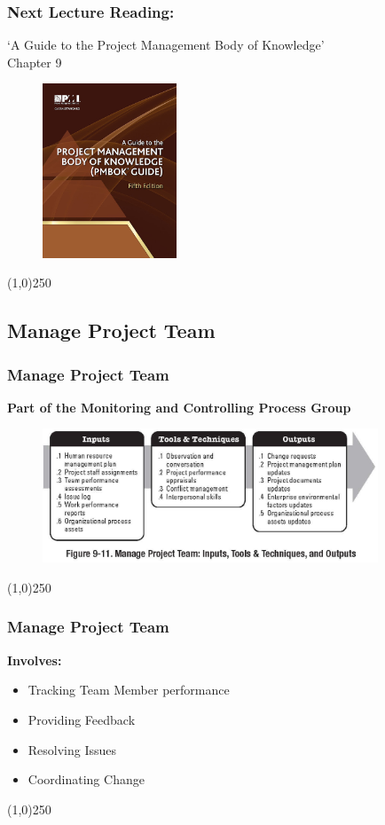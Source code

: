 \begin{frame}
\frametitle{Next Lecture \hfill Reading:}
`A Guide to the Project Management Body of Knowledge'\\ 
Chapter 9
\begin{figure}[h]
	\centering
		\includegraphics[width = 4cm]{images/book.jpg}
\end{figure}
\end{frame}\begin{center}\line(1,0){250}\end{center}
 
\subsection{Manage Project Team}
 
 

\begin{frame}
\frametitle{Manage Project Team}
\textbf{Part of the Monitoring and Controlling Process Group}
\begin{figure}
	\centering
		\includegraphics[width = 10cm]{images/Fig9-11.jpg}
	\label{fig:9-11}
\end{figure}
\end{frame}\begin{center}\line(1,0){250}\end{center}
 
 
\begin{frame}
\frametitle{Manage Project Team}
\textbf{Involves:}
\begin{itemize}
	\item Tracking Team Member performance
	\item Providing Feedback
	\item Resolving Issues
	\item Coordinating Change
\end{itemize}
\end{frame}\begin{center}\line(1,0){250}\end{center}


